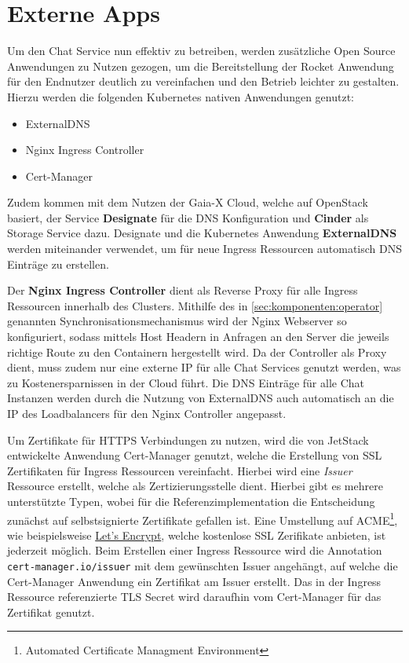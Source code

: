 \section{Externe Apps}
\label{sec:komponenten:externe-apps}

Um den Chat Service nun effektiv zu betreiben, werden zusätzliche Open Source Anwendungen zu Nutzen gezogen,
um die Bereitstellung der Rocket Anwendung für den Endnutzer deutlich zu vereinfachen und den Betrieb leichter zu gestalten.
Hierzu werden die folgenden Kubernetes nativen Anwendungen genutzt:
\begin{itemize}
  \item ExternalDNS
  \item Nginx Ingress Controller
  \item Cert-Manager
\end{itemize}

Zudem kommen mit dem Nutzen der Gaia-X Cloud, welche auf OpenStack basiert, der Service \textbf{Designate}
für die DNS Konfiguration und \textbf{Cinder} als Storage Service dazu. 
Designate und die Kubernetes Anwendung \textbf{ExternalDNS} werden miteinander
verwendet, um für neue Ingress Ressourcen automatisch DNS Einträge zu erstellen. 

Der \textbf{Nginx Ingress Controller} dient als Reverse Proxy für alle Ingress Ressourcen innerhalb des Clusters.
Mithilfe des in \ref{sec:komponenten:operator} genannten Synchronisationsmechanismus wird der Nginx Webserver so 
konfiguriert, sodass mittels Host Headern in Anfragen an den Server die jeweils richtige Route zu den Containern hergestellt wird. 
Da der Controller als Proxy dient, muss zudem nur eine externe IP für alle Chat Services genutzt werden, was
zu Kostenersparnissen in der Cloud führt. Die DNS Einträge für alle Chat Instanzen werden durch die Nutzung 
von ExternalDNS auch automatisch an die IP des Loadbalancers für den Nginx Controller angepasst.

Um Zertifikate für HTTPS Verbindungen zu nutzen, wird die von JetStack entwickelte Anwendung Cert-Manager genutzt,
welche die Erstellung von SSL Zertifikaten für Ingress Ressourcen vereinfacht. Hierbei wird eine \emph{Issuer} Ressource
erstellt, welche als Zertizierungsstelle dient.\cite{CertManager2021} Hierbei gibt es mehrere unterstützte Typen, 
wobei für die Referenzimplementation die Entscheidung zunächst auf selbstsignierte Zertifikate gefallen ist.
Eine Umstellung auf ACME\footnote{Automated Certificate Managment Environment},
wie beispielsweise \href{https://letsencrypt.org/de/}{Let's Encrypt}, welche kostenlose SSL Zerifikate anbieten,
ist jederzeit möglich. 
Beim Erstellen einer Ingress Ressource wird die Annotation \texttt{cert-manager.io/issuer} mit dem gewünschten Issuer angehängt,
auf welche die Cert-Manager Anwendung ein Zertifikat am Issuer erstellt. 
Das in der Ingress Ressource referenzierte TLS Secret wird daraufhin vom Cert-Manager für das Zertifikat genutzt.

